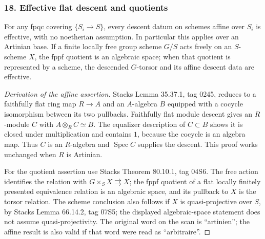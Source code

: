 \subsubsection{18. Effective flat descent and quotients}
\begin{proposition}\label{B:subject18}
For any fpqc covering $\{S_i\to S\}$, every descent datum on schemes affine over $S_i$ is effective, with no noetherian assumption. In particular this applies over an Artinian base. If a finite locally free group scheme $G/S$ acts freely on an $S$-scheme $X$, the fppf quotient is an algebraic space; when that quotient is represented by a scheme, the descended $G$-torsor and its affine descent data are effective.
\end{proposition}
\begin{proof}[Derivation of the affine assertion]
Stacks Lemma 35.37.1, tag 0245, reduces to a faithfully flat ring map $R\to A$ and an $A$-algebra $B$ equipped with a cocycle isomorphism between its two pullbacks. Faithfully flat module descent gives an $R$-module $C$ with $A\otimes_RC\simeq B$. The equalizer description of $C\subset B$ shows it is closed under multiplication and contains $1$, because the cocycle is an algebra map. Thus $C$ is an $R$-algebra and $\operatorname{Spec}C$ supplies the descent. This proof works unchanged when $R$ is Artinian.

For the quotient assertion use Stacks Theorem 80.10.1, tag 04S6. The free action identifies the relation with $G\times_SX\rightrightarrows X$; the fppf quotient of a flat locally finitely presented equivalence relation is an algebraic space, and its pullback to $X$ is the torsor relation. The scheme conclusion also follows if $X$ is quasi-projective over $S$, by Stacks Lemma 66.14.2, tag 07S5; the displayed algebraic-space statement does not assume quasi-projectivity. The original word on the scan is ``artinien''; the affine result is also valid if that word were read as ``arbitraire''.
\end{proof}

